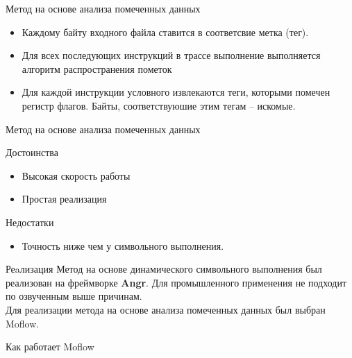 \documentclass[10pt]{beamer}
\begin{document}
\begin{frame}{Метод на основе анализа помеченных данных}

    \begin{itemize}
      \item Каждому байту входного файла ставится в соответсвие метка (тег).
      \item Для всех последующих инструкций в трассе выполнение выполняется алгоритм распространения пометок
      \item Для каждой инструкции условного извлекаются теги, которыми помечен регистр флагов. Байты, соответствуюшие этим тегам -- искомые.
    \end{itemize}
\end{frame}

\begin{frame}{Метод на основе анализа помеченных данных}

\begin{block}{Достоинства}
  \begin{itemize}
    \item Высокая скорость работы
    \item Простая реализация
  \end{itemize}
\end{block}
\pause
  \begin{block}{Недостатки}
    \begin{itemize}
      \item Точность ниже чем у символьного выполнения.
    \end{itemize}
  \end{block}
\end{frame}

\begin{frame}{Реaлизация}
Метод на основе динамического символьного выполнения был реализован на фреймворке \textbf{Angr}. Для промышленного применения не подходит по озвученным выше причинам.
\\
\pause
Для реализации метода на основе анализа помеченных данных был выбран Moflow.

\end{frame}


\begin{frame}[fragile]{Как работает Moflow}


\end{frame}
\end{document}
